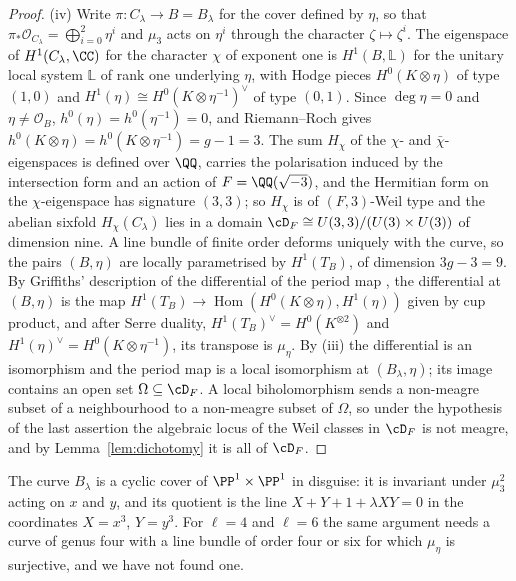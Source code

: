 \begin{proof}
(iv) Write $\pi\colon C_{\lambda}\to B=B_{\lambda}$ for the cover defined by $\eta$, so that $\pi_{*}\mathcal{O}_{C_{\lambda}}=\bigoplus_{i=0}^{2}\eta^{i}$ and $\mu_{3}$ acts on $\eta^{i}$ through the character $\zeta\mapsto\zeta^{i}$. The eigenspace of $H^{1}(C_{\lambda},\CC)$ for the character $\chi$ of exponent one is $H^{1}(B,\mathbb{L})$ for the unitary local system $\mathbb{L}$ of rank one underlying $\eta$, with Hodge pieces $H^{0}(K\otimes\eta)$ of type $(1,0)$ and $H^{1}(\eta)\cong H^{0}(K\otimes\eta^{-1})^{\vee}$ of type $(0,1)$. Since $\deg\eta=0$ and $\eta\ne\mathcal{O}_{B}$, $h^{0}(\eta)=h^{0}(\eta^{-1})=0$, and Riemann--Roch gives $h^{0}(K\otimes\eta)=h^{0}(K\otimes\eta^{-1})=g-1=3$. The sum $H_{\chi}$ of the $\chi$- and $\bar\chi$-eigenspaces is defined over $\QQ$, carries the polarisation induced by the intersection form and an action of $F=\QQ(\sqrt{-3})$, and the Hermitian form on the $\chi$-eigenspace has signature $(3,3)$; so $H_{\chi}$ is of $(F,3)$-Weil type and the abelian sixfold $H_{\chi}(C_{\lambda})$ lies in a domain $\cD_{F}\cong U(3,3)/(U(3)\times U(3))$ of dimension nine. A line bundle of finite order deforms uniquely with the curve, so the pairs $(B,\eta)$ are locally parametrised by $H^{1}(T_{B})$, of dimension $3g-3=9$. By Griffiths' description of the differential of the period map \cite[Ch.~10]{Voi02}, the differential at $(B,\eta)$ is the map $H^{1}(T_{B})\to\operatorname{Hom}(H^{0}(K\otimes\eta),H^{1}(\eta))$ given by cup product, and after Serre duality, $H^{1}(T_{B})^{\vee}=H^{0}(K^{\otimes2})$ and $H^{1}(\eta)^{\vee}=H^{0}(K\otimes\eta^{-1})$, its transpose is $\mu_{\eta}$. By (iii) the differential is an isomorphism and the period map is a local isomorphism at $(B_{\lambda},\eta)$; its image contains an open set $\Omega\subseteq\cD_{F}$. A local biholomorphism sends a non-meagre subset of a neighbourhood to a non-meagre subset of $\Omega$, so under the hypothesis of the last assertion the algebraic locus of the Weil classes in $\cD_{F}$ is not meagre, and by Lemma~\ref{lem:dichotomy} it is all of $\cD_{F}$.
\end{proof}

The curve $B_{\lambda}$ is a cyclic cover of $\PP^{1}\times\PP^{1}$ in disguise: it is invariant under $\mu_{3}^{2}$ acting on $x$ and $y$, and its quotient is the line $X+Y+1+\lambda XY=0$ in the coordinates $X=x^{3}$, $Y=y^{3}$. For $\ell=4$ and $\ell=6$ the same argument needs a curve of genus four with a line bundle of order four or six for which $\mu_{\eta}$ is surjective, and we have not found one.

